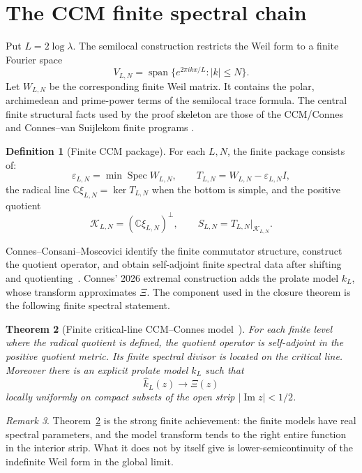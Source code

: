 \documentclass[11pt]{amsart}
\newtheorem{theorem}{Theorem}[section]
\theoremstyle{definition}
\newtheorem{definition}[theorem]{Definition}
\theoremstyle{remark}
\newtheorem{remark}[theorem]{Remark}
\newcommand{\C}{\mathbb C}
\newcommand{\K}{\mathcal K}
\newcommand{\XiR}{\Xi}
\newcommand{\eps}{\varepsilon}
\DeclareMathOperator{\Spec}{Spec}
\begin{document}
\section{The CCM finite spectral chain}

Put \(L=2\log\lambda\).  The semilocal construction restricts the Weil form
to a finite Fourier space
\[
 V_{L,N}=\operatorname{span}\{e^{2\pi ikx/L}: |k|\le N\}.
\tag{2.1}
\]
Let \(W_{L,N}\) be the corresponding finite Weil matrix.  It contains the
polar, archimedean and prime-power terms of the semilocal trace formula.
The central finite structural facts used by the proof skeleton are those
of the CCM/Connes and Connes--van Suijlekom finite programs
\cite{CCM2025,Connes2026,CvS2025}.

\begin{definition}[Finite CCM package]
\label{def:ccm-package}
For each \(L,N\), the finite package consists of:
\[
 \eps_{L,N}=\min\Spec W_{L,N},
 \qquad
 T_{L,N}=W_{L,N}-\eps_{L,N}I,
\tag{2.2}
\]
the radical line \(\C\xi_{L,N}=\ker T_{L,N}\) when the bottom is simple,
and the positive quotient
\[
 \K_{L,N}=(\C\xi_{L,N})^\perp,
 \qquad
 S_{L,N}=T_{L,N}|_{\K_{L,N}}.
\tag{2.3}
\]
\end{definition}

Connes--Consani--Moscovici identify the finite commutator structure,
construct the quotient operator, and obtain self-adjoint finite spectral
data after shifting and quotienting~\cite{CCM2025}.  Connes' 2026
extremal construction
adds the prolate model \(k_L\), whose transform approximates \(\XiR\).
The component used in the closure theorem is the following finite spectral
statement.

\begin{theorem}[Finite critical-line CCM--Connes model~\cite{CCM2025,Connes2026,CvS2025}]
\label{thm:ccm-input}
For each finite level where the radical quotient is defined, the quotient
operator is self-adjoint in the positive quotient metric.  Its finite
spectral divisor is located on the critical line.  Moreover there is an
explicit prolate model \(k_L\) such that
\[
 \widehat k_L(z)\longrightarrow \XiR(z)
\tag{2.4}
\]
locally uniformly on compact subsets of the open strip
\(|\operatorname{Im}z|<1/2\).
\end{theorem}

\begin{remark}
Theorem~\ref{thm:ccm-input} is the strong finite achievement: the finite
models have real spectral parameters, and the model transform tends to the
right entire function in the interior strip.  What it does not by itself
give is lower-semicontinuity of the indefinite Weil form in the global
limit.
\end{remark}
\end{document}
